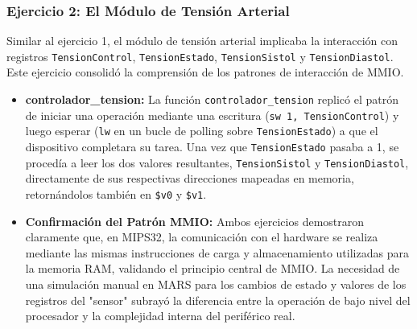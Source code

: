 \documentclass[12pt, a4paper]{article}
\begin{document}
\subsubsection*{Ejercicio 2: El Módulo de Tensión Arterial}
Similar al ejercicio 1, el módulo de tensión arterial implicaba la interacción con registros \texttt{TensionControl}, \texttt{TensionEstado}, \texttt{TensionSistol} y \texttt{TensionDiastol}. Este ejercicio consolidó la comprensión de los patrones de interacción de MMIO.
\begin{itemize}
    \item \textbf{controlador\_tension:} La función \texttt{controlador\_tension} replicó el patrón de iniciar una operación mediante una escritura (\texttt{sw 1, TensionControl}) y luego esperar (\texttt{lw} en un bucle de polling sobre \texttt{TensionEstado}) a que el dispositivo completara su tarea. Una vez que \texttt{TensionEstado} pasaba a 1, se procedía a leer los dos valores resultantes, \texttt{TensionSistol} y \texttt{TensionDiastol}, directamente de sus respectivas direcciones mapeadas en memoria, retornándolos también en \texttt{\$v0} y \texttt{\$v1}.
    \item \textbf{Confirmación del Patrón MMIO:} Ambos ejercicios demostraron claramente que, en MIPS32, la comunicación con el hardware se realiza mediante las mismas instrucciones de carga y almacenamiento utilizadas para la memoria RAM, validando el principio central de MMIO. La necesidad de una simulación manual en MARS para los cambios de estado y valores de los registros del "sensor" subrayó la diferencia entre la operación de bajo nivel del procesador y la complejidad interna del periférico real.
\end{itemize}
\end{document}
